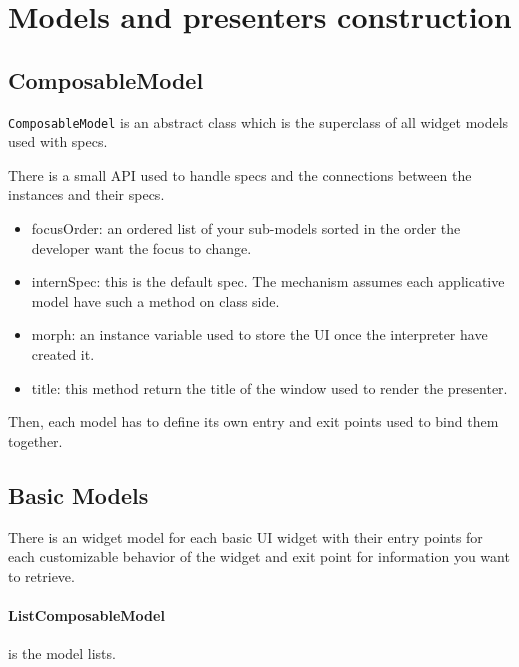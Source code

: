 \documentclass[a4paper,10pt,twoside]{book}
\begin{document}
\section{Models and presenters construction}

\subsection{ComposableModel}

\verb+ComposableModel+ is an abstract class which is the superclass of all widget models used with specs.

There is a small API used to handle specs and the connections between the instances and their specs.

\begin{itemize}
	\item focusOrder: an ordered list of your sub-models sorted in the order the developer want the focus to change.
	\item internSpec: this is the default spec. The mechanism assumes each applicative model have such a method on class side.
	\item morph: an instance variable used to store the UI once the interpreter have created it.	
	\item title: this method return the title of the window used to render the presenter.
\end{itemize}

Then, each model has to define its own entry and exit points used to bind them together.

\subsection{Basic Models}

There is an widget model for each basic UI widget  with their entry points for each customizable behavior of the widget and exit point for information you want to retrieve.  

\paragraph{ListComposableModel} is the model lists.
\end{document}
